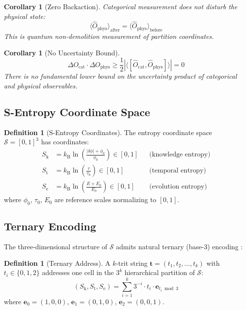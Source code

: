 \documentclass[11pt,a4paper]{article}
\newtheorem{corollary}[theorem]{Corollary}
\theoremstyle{definition}
\newtheorem{definition}[theorem]{Definition}
\theoremstyle{remark}
\newcommand{\kB}{k_{\mathrm{B}}}
\newcommand{\Sk}{S_{\mathrm{k}}}
\newcommand{\St}{S_{\mathrm{t}}}
\newcommand{\Se}{S_{\mathrm{e}}}
\newcommand{\Sspace}{\mathcal{S}}
\begin{document}
\begin{corollary}[Zero Backaction]
\label{cor:backaction}
Categorical measurement does not disturb the physical state:
\begin{equation}
\langle \hat{O}_{\mathrm{phys}} \rangle_{\mathrm{after}} = \langle \hat{O}_{\mathrm{phys}} \rangle_{\mathrm{before}}
\end{equation}
This is quantum non-demolition measurement of partition coordinates.
\end{corollary}

\begin{corollary}[No Uncertainty Bound]
\label{cor:no_uncertainty}
\begin{equation}
\Delta O_{\mathrm{cat}} \cdot \Delta O_{\mathrm{phys}} \geq \frac{1}{2} |\langle [\hat{O}_{\mathrm{cat}}, \hat{O}_{\mathrm{phys}}] \rangle| = 0
\end{equation}
There is no fundamental lower bound on the uncertainty product of categorical and physical observables.
\end{corollary}

\subsection{S-Entropy Coordinate Space}

\begin{definition}[S-Entropy Coordinates]
\label{def:s_entropy}
The entropy coordinate space $\Sspace = [0,1]^3$ has coordinates:
\begin{align}
\Sk &= \kB \ln\!\left(\frac{|\delta\phi| + \phi_0}{\phi_0}\right) \in [0,1] && \text{(knowledge entropy)} \\
\St &= \kB \ln\!\left(\frac{\tau}{\tau_0}\right) \in [0,1] && \text{(temporal entropy)} \\
\Se &= \kB \ln\!\left(\frac{E + E_0}{E_0}\right) \in [0,1] && \text{(evolution entropy)}
\end{align}
where $\phi_0$, $\tau_0$, $E_0$ are reference scales normalizing to $[0,1]$.
\end{definition}

\subsection{Ternary Encoding}

The three-dimensional structure of $\Sspace$ admits natural ternary (base-3) encoding \citep{shannon1948}:

\begin{definition}[Ternary Address]
A $k$-trit string $\mathbf{t} = (t_1, t_2, \ldots, t_k)$ with $t_i \in \{0, 1, 2\}$ addresses one cell in the $3^k$ hierarchical partition of $\Sspace$:
\begin{equation}
(\Sk, \St, \Se) = \sum_{i=1}^{k} 3^{-i} \cdot t_i \cdot \mathbf{e}_{t_i \bmod 3}
\end{equation}
where $\mathbf{e}_0 = (1,0,0)$, $\mathbf{e}_1 = (0,1,0)$, $\mathbf{e}_2 = (0,0,1)$.
\end{definition}
\end{document}
